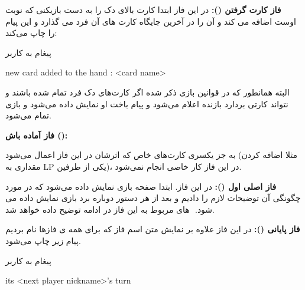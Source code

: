 \documentclass[]{article}
\begin{document}
\vspace{.5cm}
\textbf{فاز کارت گرفتن ():}
در این فاز ابتدا کارت بالای دک را به دست بازیکنی که نوبت اوست اضافه می کند و 
آن را در آخرین جایگاه کارت های آن فرد می گذارد و این پیام را چاپ می‌کند:
\begin{mybox}[colback=yellow]{پیغام به کاربر}
	\begin{latin}	
		new card added to the hand : <card name>
	\end{latin}
\end{mybox}
البته همانطور که در قوانین بازی ذکر شده اگر کارت‌های دک فرد تمام شده باشند و 
نتواند کارتی بردارد بازنده اعلام می‌شود و پیام باخت او نمایش داده می‌شود و 
بازی تمام می‌شود.

\vspace{.5cm}
\textbf{فاز آماده باش ():}

به جز یکسری کارت‌های خاص که اثرشان در این فاز اعمال می‌شود (مثلا اضافه کردن مقداری به LP یکی از طرفین)، در این فاز کار خاصی انجام نمی‌شود.

\vspace{.5cm}
\textbf{فاز اصلی اول ():}
در این فاز. ابتدا صفحه بازی نمایش داده می‌شود که در مورد چگونگی آن توضیحات 
لازم را دادیم و بعد از هر دستور دوباره برد بازی نمایش داده می شود. 
‌ های مربوط به این فاز در ادامه توضیح داده خواهد شد.

\vspace{.5cm}
\textbf{فاز پایانی ():}
    در این فاز علاوه بر نمایش متن اسم فاز که برای همه ی فازها نام بردیم پیام 
    زیر چاپ می‌شود. 
\begin{mybox}[colback=yellow]{پیغام به کاربر}
	\begin{latin}	
	    its <next player nickname>’s turn
	\end{latin}
\end{mybox}
\end{document}
